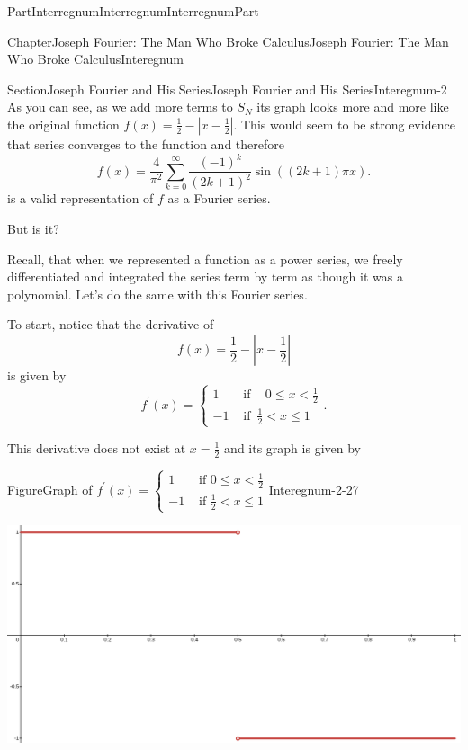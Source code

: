 \documentclass[oneside,10pt,]{book}
\numberwithin{equation}{part}
\newcommand{\abs}[1]{\left|#1\right|}
\newcommand{\lt}{<}
\newcommand{\amp}{&}
\begin{document}
\begin{partptx}{Part}{Interregnum}{}{Interregnum}{}{}{InterregnumPart}
\begin{chapterptx}{Chapter}{Joseph Fourier: The Man Who Broke Calculus}{}{Joseph Fourier: The Man Who Broke Calculus}{}{}{Interegnum}
\begin{sectionptx}{Section}{Joseph Fourier and His Series}{}{Joseph Fourier and His Series}{}{}{Interegnum-2}
As you can see, as we add more terms to \(S_N\) its graph looks more and more like the original function \(f(x)=\frac{1}{2}-\abs{x-\frac{1}{2}}\).  This would seem to be strong evidence that series converges to the function and therefore%
\begin{equation}
f(x)=\frac{4}{\pi^2}\sum_{k=0}^\infty\frac{\left(-1\right)^k}{\left(2k+1\right)^2}\sin\left(\left(2k+1\right)\pi x\right)\text{.}\label{PDE_sol}
\end{equation}
is a valid representation of \(f\) as a Fourier series.%
\par
But is it?%
\par
Recall, that when we represented a function as a power series, we freely differentiated and integrated the series term by term as though it was a polynomial. Let's do the same with this Fourier series.%
\par
To start, notice that the derivative of%
\begin{equation*}
f(x)=\frac{1}{2}-\abs{x-\frac{1}{2}}
\end{equation*}
is given by%
\begin{equation*}
f^\prime(x) = \begin{cases}1\amp \text{ if } \,\text{ } 0\leq x\lt \frac{1}{2}\\ -1\amp \text{ if } \,\frac{1}{2}\lt x\leq 1 \end{cases} \text{.}
\end{equation*}
%
\par
This derivative does not exist at \(x=\frac{1}{2}\) and its graph is given by%
\begin{figureptx}{Figure}{Graph of \(f^\prime(x) = 
\begin{cases}
1\amp \text{ if }  0\leq x\lt \frac{1}{2}\\ 
-1\amp \text{ if } \frac{1}{2}\lt x\leq 1 
\end{cases} \)}{Interegnum-2-27}{}%
\begin{image}{0.125}{0.75}{0.125}{}%
\includegraphics[width=\linewidth]{external/images/Ch2fig1-1.png}

\end{image}
\end{figureptx}
\end{sectionptx}
\end{chapterptx}
\end{partptx}
\end{document}
